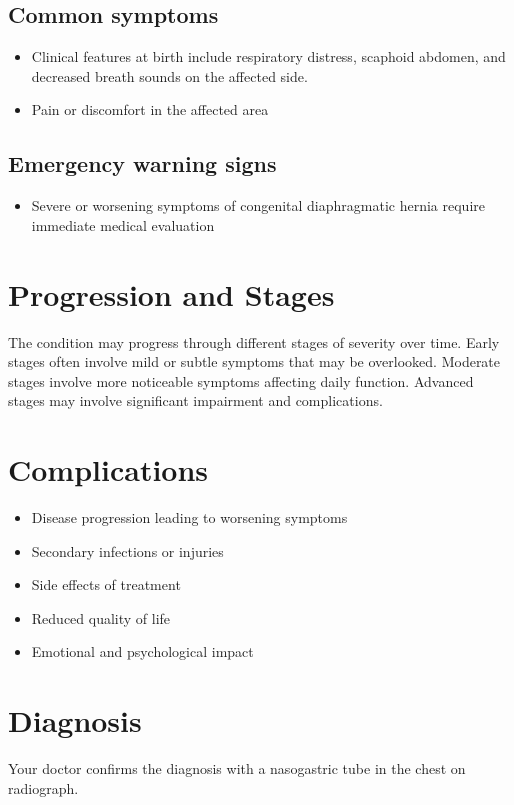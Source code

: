 \subsection{Common symptoms}
\begin{itemize}[noitemsep]
  \item Clinical features at birth include respiratory distress, scaphoid abdomen, and decreased breath sounds on the affected side.

  \item Pain or discomfort in the affected area
  \end{itemize}

\subsection{Emergency warning signs}
\begin{itemize}[noitemsep]
  \item Severe or worsening symptoms of congenital diaphragmatic hernia require immediate medical evaluation
\end{itemize}
\section{Progression and Stages}
The condition may progress through different stages of severity over time. Early stages often involve mild or subtle symptoms that may be overlooked. Moderate stages involve more noticeable symptoms affecting daily function. Advanced stages may involve significant impairment and complications.
\section{Complications}
\begin{itemize}[noitemsep]
  \item Disease progression leading to worsening symptoms
  \item Secondary infections or injuries
  \item Side effects of treatment
  \item Reduced quality of life
  \item Emotional and psychological impact
\end{itemize}
\section{Diagnosis}
Your doctor confirms the diagnosis with a nasogastric tube in the chest on radiograph.

